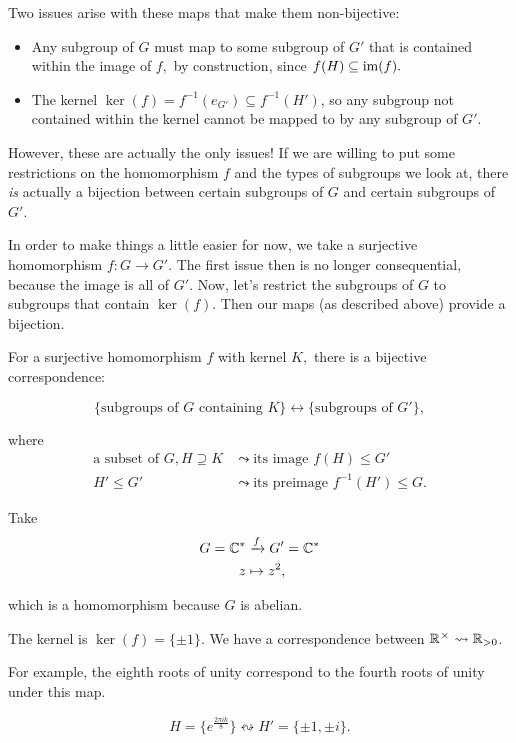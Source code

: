 Two issues arise with these maps that make them non-bijective:
\begin{itemize}
    \item Any subgroup of $G$ must map to some subgroup of $G'$ that is contained within the image of $f,$ by construction, since $f(H) \subseteq \operatorname{im}(f).$ 
    \item The kernel $\ker(f) = f^{-1}(e_{G'}) \subseteq f^{-1}(H')$, so any subgroup not contained within the kernel cannot be mapped to by any subgroup of $G'.$
\end{itemize}

However, these are actually the only issues! If we are willing to put some restrictions on the homomorphism $f$ and the types of subgroups we look at, there \emph{is} actually a bijection between certain subgroups of $G$ and certain subgroups of $G'$.

In order to make things a little easier for now, we take a surjective homomorphism
$f: G \rightarrow G'$. The first issue then is no longer consequential, because the image is all of $G'$. Now, let's restrict the subgroups of $G$ to subgroups that contain $\ker(f).$ Then our maps (as described above) provide a bijection. 

\begin{theorem}
For a surjective homomorphism $f$ with kernel $K,$ there is a bijective correspondence:

\[\{\text{subgroups of } G \text{ containing } K\} \leftrightarrow \{\text{subgroups of } G'\},\] 

where 
\begin{align*}
    \text{a subset of }G, H \supseteq K &\leadsto \text{its image } f(H) \leq G' \\
    H' \leq G' &\leadsto \text{its preimage } f^{-1}(H') \leq G.
\end{align*}
\end{theorem}


\begin{example}
Take
\begin{align*}
G = \mathbb C^{*} &\xrightarrow{f} G' = \mathbb C^{*}  \\
z &\mapsto z^2,
\end{align*}

which is a homomorphism because $G$ is abelian.

The kernel is $\ker(f) = \{\pm 1\}.$ We have a correspondence between $\mathbb R^{\hspace{0.05em}{\times}\hspace{0.05em}} \leadsto \mathbb R_{>0}$. 

For example, the eighth roots of unity correspond to the fourth roots of unity under this map. 

\[H = \{e^{\frac{2\pi ik}{8}}\} \leftrightsquigarrow H' = \{\pm 1, \pm i\}.\]
\end{example}

\newpage